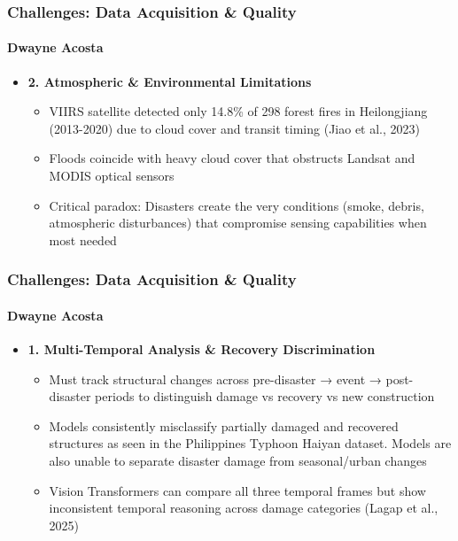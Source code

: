 \documentclass{beamer}
\newcommand{\namedframe}[3]{
  \begin{frame}
    \frametitle{#2}
    \framesubtitle{#1}
    #3
  \end{frame}
}
\begin{document}
\namedframe{Dwayne Acosta}{Challenges: Data Acquisition \& Quality}{
\begin{itemize}
    \item \textbf{2. Atmospheric \& Environmental Limitations}
    \begin{itemize}
        \item VIIRS satellite detected only 14.8\% of 298 forest fires in Heilongjiang (2013-2020) due to cloud cover and transit timing (Jiao et al., 2023)
        \item Floods coincide with heavy cloud cover that obstructs Landsat and MODIS optical sensors
        \item Critical paradox: Disasters create the very conditions (smoke, debris, atmospheric disturbances) that compromise sensing capabilities when most needed

    \end{itemize}
\end{itemize}
}


\namedframe{Dwayne Acosta}{Challenges: Data Acquisition \& Quality}{
\begin{itemize}
    \item \textbf{1. Multi-Temporal Analysis \& Recovery Discrimination}
    \begin{itemize}
        \item Must track structural changes across pre-disaster → event → post-disaster periods to distinguish damage vs recovery vs new construction
        \item Models consistently misclassify partially damaged and recovered structures as seen in the Philippines Typhoon Haiyan dataset. Models are also unable to separate disaster damage from seasonal/urban changes
        \item Vision Transformers can compare all three temporal frames but show inconsistent temporal reasoning across damage categories (Lagap et al., 2025)
    \end{itemize}
\end{itemize}    
}
\end{document}
